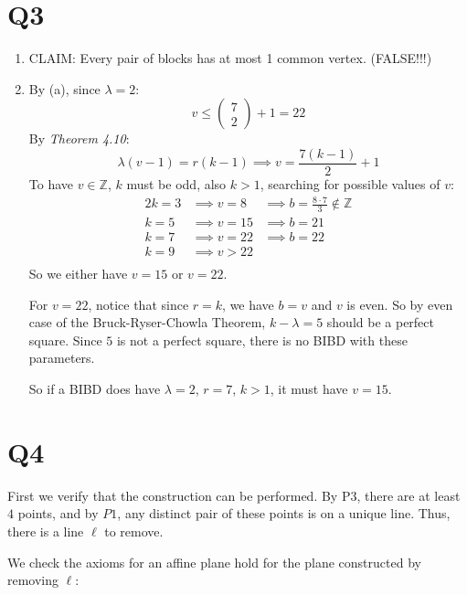 \documentclass[a4paper, 11pt]{article}
\newcommand{\ZZ}{\mathbb{Z}}
\begin{document}
\pagebreak
\section*{Q3}
\begin{enumerate}[label=(\alph*)]
	\item CLAIM: Every pair of blocks has at most 1 common vertex. (FALSE!!!)
	



	\item By (a), since $\lambda=2$:
	\[
		v\leq \begin{pmatrix}
		7\\2
	\end{pmatrix}+1=22
	\]
	By \textit{Theorem 4.10}:
	\[
		\lambda(v-1)=r(k-1) \implies v=\frac{7(k-1)}{2}+1
	\]
	To have $v\in\ZZ$, $k$ must be odd, also $k>1$, searching for possible values of $v$: 
	\begin{alignat*}{2}
		k=3 & \implies v=8  & \implies b=\frac{8\cdot 7}{3} \notin\ZZ	\\
		k=5 & \implies v=15 & \implies b=21	\\
		k=7 & \implies v=22 & \implies b=22\\
		k=9 & \implies v>22  	\\
	\end{alignat*}
	So we either have $v=15$ or $v=22$. 
	
	For $v=22$, notice that since $r=k$, we have $b=v$ and $v$ is even. So by even case of the Bruck-Ryser-Chowla Theorem, $k-\lambda=5$ should be a perfect square. Since $5$ is not a perfect square, there is no BIBD with these parameters.


	So if a BIBD does have $\lambda=2$, $r=7$, $k>1$, it must have $v=15$. 
\end{enumerate}

\pagebreak
\section*{Q4}
First we verify that the construction can be performed. By P3, there are at least $4$ points, and by $P1$, any distinct pair of these points is on a unique line. Thus, there is a line $\ell$ to remove. 

We check the axioms for an affine plane hold for the plane constructed by removing $\ell$: 
\end{document}
